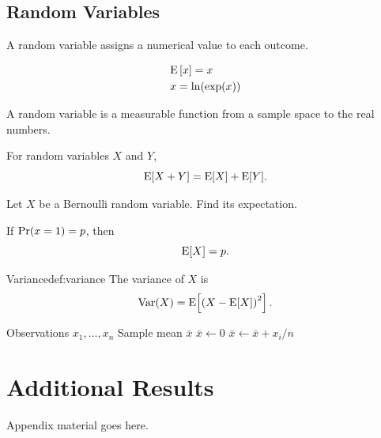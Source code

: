 \documentclass[11pt,a4paper]{article}
\begin{document}
\subsection{Random Variables}

A random variable assigns a numerical value to each outcome.

\begin{equation}
  \begin{aligned}
    & \mathrm{E}\bracket{x} = x \\
    & x = \ln\paren{\exp\paren{x}}
  \end{aligned}
\end{equation}

\begin{definition}
A random variable is a measurable function from a sample space
to the real numbers.
\end{definition}

\begin{theorem}
For random variables \(X\) and \(Y\),
\[
  \mathrm{E}[X+Y]
  =
  \mathrm{E}[X]+\mathrm{E}[Y].
\]
\end{theorem}

\begin{question}[Expectation]
Let \(X\) be a Bernoulli random variable. Find its expectation.
\end{question}

\begin{kaitou}
If $\mathrm{Pr}\paren{x=1} = p$, then
\[
  \mathrm{E}[X]=p.
\]
\end{kaitou}

\begin{defbox}{Variance}{def:variance}
The variance of \(X\) is
\[
  \operatorname{Var}(X)
  =
  \mathrm{E}\!\left[
    \left(X-\mathrm{E}[X]\right)^2
  \right].
\]
\end{defbox}

\begin{algorithm}
  \caption{Calculate the sample mean}
  \begin{algorithmic}
    \AlgInput Observations \(x_1,\dots,x_n\)
    \AlgOutput Sample mean \(\bar{x}\)
    \State \(\bar{x}\gets 0\)
      \State \(\bar{x}\gets\bar{x}+x_i/n\)
    \EndFor
  \end{algorithmic}
\end{algorithm}


\appendix
\section{Additional Results}

Appendix material goes here.
\end{document}
